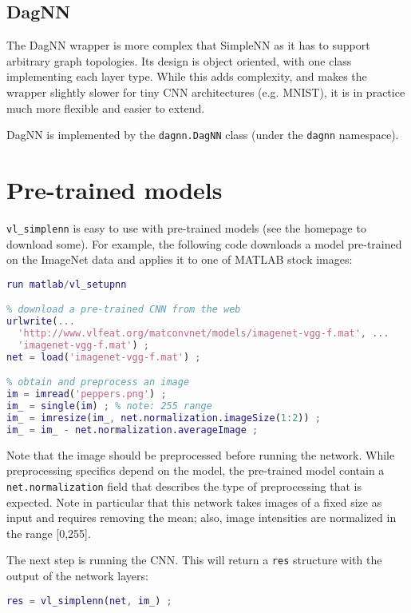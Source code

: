\subsection{DagNN}\label{s:dagnn}

The DagNN wrapper is more complex that SimpleNN as it has to support arbitrary graph topologies. Its design is object oriented, with one class implementing each layer type. While this adds complexity, and makes the wrapper slightly slower for tiny CNN architectures (e.g. MNIST), it is in practice much more flexible and easier to extend.

DagNN is implemented by the \verb!dagnn.DagNN! class (under the \verb!dagnn! namespace).

\section{Pre-trained models}\label{s:pretrained}

\verb!vl_simplenn! is easy to use with pre-trained models (see the homepage to download some). For example, the following code downloads a model pre-trained on the ImageNet data and applies it to one of MATLAB stock images:
\begin{lstlisting}[language=Matlab]
% setup MatConvNet in MATLAB
run matlab/vl_setupnn

% download a pre-trained CNN from the web
urlwrite(...
  'http://www.vlfeat.org/matconvnet/models/imagenet-vgg-f.mat', ...
  'imagenet-vgg-f.mat') ;
net = load('imagenet-vgg-f.mat') ;

% obtain and preprocess an image
im = imread('peppers.png') ;
im_ = single(im) ; % note: 255 range
im_ = imresize(im_, net.normalization.imageSize(1:2)) ;
im_ = im_ - net.normalization.averageImage ;
\end{lstlisting}
Note that the image should be preprocessed before running the network. While preprocessing specifics depend on the model, the pre-trained model contain a \verb!net.normalization! field that describes the type of preprocessing that is expected. Note in particular that this network takes images of a fixed size as input and requires removing the mean; also, image intensities are normalized in the range [0,255].

The next step is running the CNN. This will return a \verb!res! structure with the output of the network layers:
\begin{lstlisting}[language=Matlab]
% run the CNN
res = vl_simplenn(net, im_) ;
\end{lstlisting}

